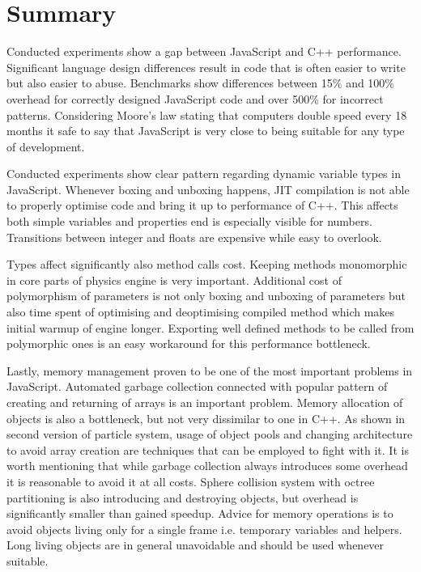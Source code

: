 \chapter{Summary}
\label{cha:summary}

Conducted experiments show a gap between JavaScript and C++ performance. Significant language design differences result in code that is often easier to write but also easier to abuse. Benchmarks show differences between 15\% and 100\% overhead for correctly designed JavaScript code and over 500\% for incorrect patterns.  Considering Moore's law stating that computers double speed every 18 months it safe to say that JavaScript is very close to being suitable for any type of development. 

Conducted experiments show clear pattern regarding dynamic variable types in JavaScript. Whenever boxing and unboxing happens, JIT compilation is not able to properly optimise code and bring it up to performance of C++. This affects both simple variables and properties end is especially visible for numbers. Transitions between integer and floats are expensive while easy to overlook.

Types affect significantly also method calls cost. Keeping methods monomorphic in core parts of physics engine is very important. Additional cost of polymorphism of parameters is not only boxing and unboxing of parameters but also time spent of optimising and deoptimising compiled method which makes initial warmup of engine longer. Exporting well defined methods to be called from polymorphic ones is an easy workaround for this performance bottleneck.

Lastly, memory management proven to be one of the most important problems in JavaScript. Automated garbage collection connected with popular pattern of creating and returning of arrays is an important problem. Memory allocation of objects is also a bottleneck, but not very dissimilar to one in C++. As shown in second version of particle system, usage of object pools and changing architecture to avoid array creation are techniques that can be employed to fight with it. It is worth mentioning that while garbage collection always introduces some overhead it is reasonable to avoid it at all costs. Sphere collision system with octree partitioning is also introducing and destroying objects, but overhead is significantly smaller than gained speedup. Advice for memory operations is to avoid objects living only for a single frame i.e. temporary variables and helpers. Long living objects are in general unavoidable and should be used whenever suitable.

